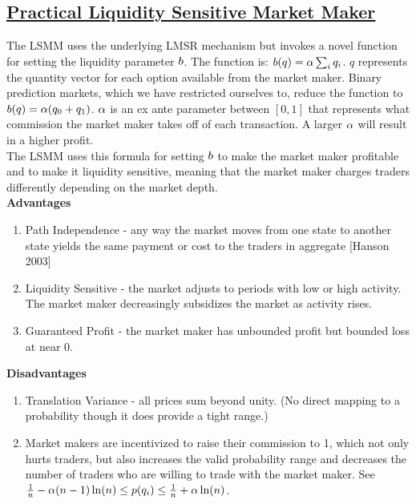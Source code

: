 \subsection{\href{https://www.cs.cmu.edu/~sandholm/liquidity-sensitive automated market maker.teac.pdf}{Practical Liquidity Sensitive Market Maker}}
The LSMM uses the underlying LMSR mechanism but invokes a novel
function for setting the liquidity parameter $b$. The function is:
$b(q) = \alpha \sum_{i} q_i$. $q$ represents the quantity vector
for each option available from the market maker. Binary prediction markets, which
we have restricted ourselves to, reduce the function to $b(q) = \alpha ({q_0} + {q_1})$. 
$\alpha$ is an ex ante parameter 
between $[0,1]$ that represents what commission the market maker takes
off of each transaction. A larger $\alpha$ will result in a higher
profit.\\

The LSMM uses this formula for setting $b$ to make the market
maker profitable and to make it liquidity sensitive, meaning that
the market maker charges traders differently depending on the market
depth. \\

\textbf{Advantages}\\
\begin{enumerate}
\item{Path Independence - any way the market moves from one state to another state yields the same payment or cost to the traders in aggregate [Hanson 2003]}
\item{Liquidity Sensitive - the market adjusts to periods with low or high activity. The market maker decreasingly subsidizes the market as activity rises.}
\item{Guaranteed Profit - the market maker has unbounded profit but bounded
loss at near 0.}
\end{enumerate}

\textbf{Disadvantages} \\
\begin{enumerate}
\item{Translation Variance - all prices sum beyond unity. (No direct mapping to a probability though it does provide a tight range.)}
\item Market makers are incentivized to raise their commission to 1, which not only hurts traders, but also increases the valid probability range
and decreases the number of traders who are willing to trade with the market maker. See $\frac{1}{n} - \alpha(n - 1)\ln(n) \leq p(q_i) \leq \frac{1}{n} + \alpha\ln(n)$.
\end{enumerate}

